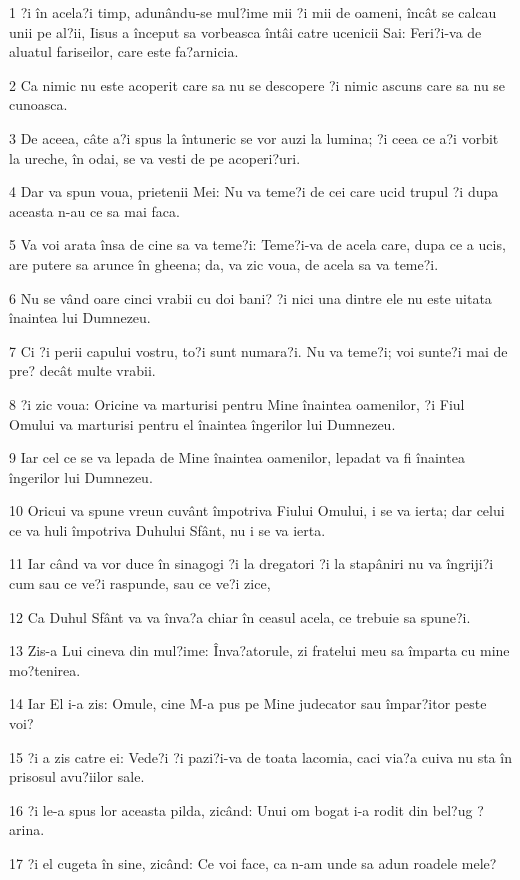 \par 1 ?i în acela?i timp, adunându-se mul?ime mii ?i mii de oameni, încât se calcau unii pe al?ii, Iisus a început sa vorbeasca întâi catre ucenicii Sai: Feri?i-va de aluatul fariseilor, care este fa?arnicia.
\par 2 Ca nimic nu este acoperit care sa nu se descopere ?i nimic ascuns care sa nu se cunoasca.
\par 3 De aceea, câte a?i spus la întuneric se vor auzi la lumina; ?i ceea ce a?i vorbit la ureche, în odai, se va vesti de pe acoperi?uri.
\par 4 Dar va spun voua, prietenii Mei: Nu va teme?i de cei care ucid trupul ?i dupa aceasta n-au ce sa mai faca.
\par 5 Va voi arata însa de cine sa va teme?i: Teme?i-va de acela care, dupa ce a ucis, are putere sa arunce în gheena; da, va zic voua, de acela sa va teme?i.
\par 6 Nu se vând oare cinci vrabii cu doi bani? ?i nici una dintre ele nu este uitata înaintea lui Dumnezeu.
\par 7 Ci ?i perii capului vostru, to?i sunt numara?i. Nu va teme?i; voi sunte?i mai de pre? decât multe vrabii.
\par 8 ?i zic voua: Oricine va marturisi pentru Mine înaintea oamenilor, ?i Fiul Omului va marturisi pentru el înaintea îngerilor lui Dumnezeu.
\par 9 Iar cel ce se va lepada de Mine înaintea oamenilor, lepadat va fi înaintea îngerilor lui Dumnezeu.
\par 10 Oricui va spune vreun cuvânt împotriva Fiului Omului, i se va ierta; dar celui ce va huli împotriva Duhului Sfânt, nu i se va ierta.
\par 11 Iar când va vor duce în sinagogi ?i la dregatori ?i la stapâniri nu va îngriji?i cum sau ce ve?i raspunde, sau ce ve?i zice,
\par 12 Ca Duhul Sfânt va va înva?a chiar în ceasul acela, ce trebuie sa spune?i.
\par 13 Zis-a Lui cineva din mul?ime: Înva?atorule, zi fratelui meu sa împarta cu mine mo?tenirea.
\par 14 Iar El i-a zis: Omule, cine M-a pus pe Mine judecator sau împar?itor peste voi?
\par 15 ?i a zis catre ei: Vede?i ?i pazi?i-va de toata lacomia, caci via?a cuiva nu sta în prisosul avu?iilor sale.
\par 16 ?i le-a spus lor aceasta pilda, zicând: Unui om bogat i-a rodit din bel?ug ?arina.
\par 17 ?i el cugeta în sine, zicând: Ce voi face, ca n-am unde sa adun roadele mele?
